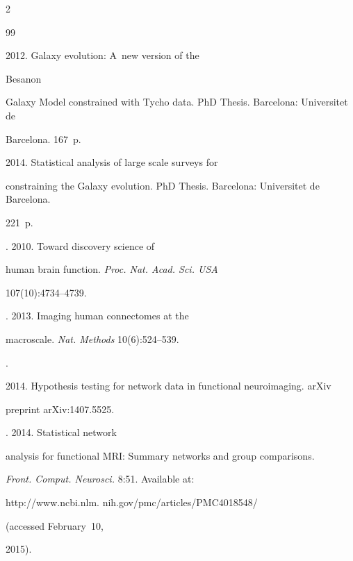 \begin{multicols}{2}
{{\begin{thebibliography}{99}


 2012. Galaxy evolution: A~new version of the


Besan{\fontsize{10pt}{10pt}\selectfont{}}on


Galaxy Model constrained with Tycho data. PhD Thesis. Barcelona: Universitet de


Barcelona. 167~p.




 2014. Statistical analysis  of large scale surveys for


constraining the Galaxy evolution. PhD Thesis. Barcelona: Universitet de Barcelona.


221~p.




. 2010. Toward discovery science of


human brain function. \textit{Proc. Nat. Acad. Sci. USA}


107(10):4734--4739.




. 2013. Imaging human connectomes at the


macroscale. \textit{Nat. Methods} 10(6):524--539.




.


2014. Hypothesis testing for network data in functional neuroimaging. arXiv


preprint \mbox{arXiv}:1407.5525.




. 2014. Statistical network


analysis for functional MRI: Summary networks and group comparisons.


\textit{Front. Comput. Neurosci.} 8:51. Available at: {\sf


http://www.ncbi.nlm. nih.gov/pmc/articles/PMC4018548/} (accessed February~10,


2015).





\end{thebibliography}}}
\end{multicols}
